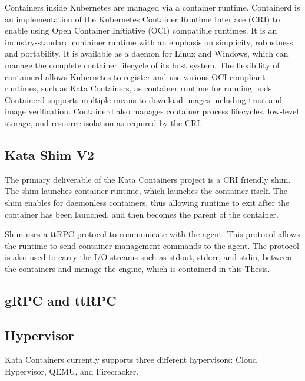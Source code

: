 Containers inside Kubernetes are managed via a container runtime. Containerd is an implementation of the Kubernetes Container Runtime Interface (CRI) to enable using Open Container Initiative (OCI) compatible runtimes. It is an industry-standard container runtime with an emphasis on simplicity, robustness and portability. It is available as a daemon for Linux and Windows, which can manage the complete container lifecycle of its host system. The flexibility of containerd allows Kubernetes to register and use various OCI-compliant runtimes, such as Kata Containers, as container runtime for running pods. Containerd supports multiple means to download images including trust and image verification. Containerd also manages container process lifecycles, low-level storage, and resource isolation as required by the CRI. \cite{containerd} \cite{containerdGithub}

\subsection{Kata Shim V2}

The primary deliverable of the Kata Containers project is a CRI friendly shim. The shim launches container runtime, which launches the container itself. The shim enables for daemonless containers, thus allowing runtime to exit after the container has been launched, and then becomes the parent of the container. \cite{Crosby}

Shim uses a ttRPC protocol to communicate with the agent. This protocol allows the runtime to send container management commands to the agent. The protocol is also used to carry the I/O streams such as stdout, stderr, and stdin, between the containers and manage the engine, which is containerd in this Thesis.

\subsection{gRPC and ttRPC}




\subsection{Hypervisor}

Kata Containers currently supports three different hypervisors: Cloud Hypervisor, QEMU, and Firecracker.








